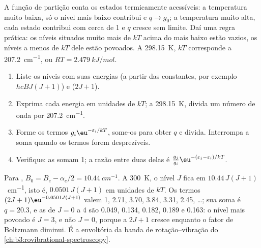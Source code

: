 A função de partição conta os estados termicamente acessíveis: a temperatura
muito baixa, só o nível mais baixo contribui e $q \to g_0$; a temperatura muito
alta, cada estado contribui com cerca de 1 e $q$ cresce sem limite. Daí uma
regra prática: os níveis situados muito mais de $kT$ acima do mais baixo estão
vazios, os níveis a menos de $kT$ dele estão povoados. A \qty{298.15}{K}, $kT$
corresponde a \qty{207.2}{cm^{-1}}, ou $RT = \qty{2.479}{kJ/mol}$.

\begin{method}\label{met:b3:partition-functions:populations}
\begin{enumerate}
  \item Liste os níveis com suas energias (a partir das constantes, por exemplo
        $hcBJ(J+1)$) e  ($2J + 1$).
  \item Exprima cada energia em unidades de $kT$; a \qty{298.15}{K}, divida um
        número de onda por \qty{207.2}{cm^{-1}}.
  \item Forme os termos $g_i\eu^{-\varepsilon_i/kT}$, some-os para obter $q$ e divida.
        Interrompa a soma quando os termos forem desprezíveis.
  \item Verifique: as  somam 1; a razão entre duas delas é
        $\frac{g_j}{g_i}\eu^{-(\varepsilon_j-\varepsilon_i)/kT}$.
\end{enumerate}
\end{method}

\begin{example}\label{ex:b3:partition-functions:hcl}
Para , $B_0 = B_e - \alpha_e/2 = \qty{10.44}{cm^{-1}}$. A \qty{300}{K}, o nível $J$
fica em $10.44\,J(J+1)$~\unit{cm^{-1}}, isto é, $0.0501\,J(J+1)$ em unidades de $kT$. Os termos
$(2J+1)\eu^{-0.0501J(J+1)}$ valem 1, 2.71, 3.70, 3.84, 3.31, 2.45, \dots; sua soma é
$q = 20.3$, e as  de $J = 0$ a 4 são 0.049, 0.134, 0.182, 0.189 e
0.163: o nível mais povoado é $J = 3$, e não $J = 0$, porque a 
$2J + 1$ cresce enquanto o fator de Boltzmann diminui. É a envoltória da
banda de rotação--vibração do \cref{ch:b3:rovibrational-spectroscopy}.
\end{example}

